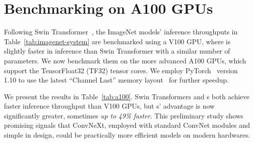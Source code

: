 
\section{Benchmarking on A100 GPUs}
\label{sec:a100}

Following Swin Transformer~\cite{Liu2021swin}, the ImageNet models' inference throughputs in Table~\ref{tab:imagenet-system} are benchmarked using a V100 GPU, where \cnn{} is slightly faster in inference than Swin Transformer with a similar number of parameters. We now benchmark them on the more advanced A100 GPUs, which support the TensorFloat32 (TF32) tensor cores. We employ PyTorch~\cite{pytorch} version 1.10 to use the latest ``Channel Last'' memory layout~\cite{clpytorch} for further speedup.

We present the results in Table~\ref{tab:a100}. Swin Transformers and \cnn{}s both achieve faster inference throughput than V100 GPUs, but \cnn{}s' advantage is now significantly greater, sometimes \emph{up to 49\% faster}. This preliminary study shows promising signals that ConvNeXt, employed with standard ConvNet modules and simple in design, could be practically more efficient models on modern hardwares. 


